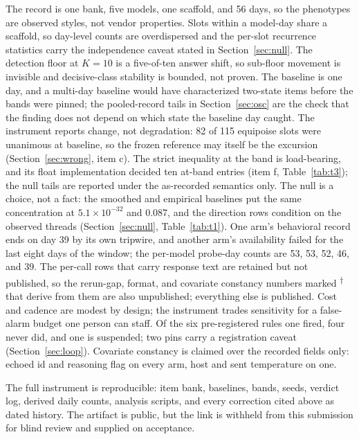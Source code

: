 \documentclass[conference]{IEEEtran}
\newcommand{\rows}{\textsuperscript{$\dagger$}}
\begin{document}
The record is one bank, five models, one scaffold, and 56 days, so the
phenotypes are observed styles, not vendor properties. Slots within a
model-day share a scaffold, so day-level counts are overdispersed and
the per-slot recurrence statistics carry the independence caveat
stated in Section~\ref{sec:null}. The detection floor at $K{=}10$ is a
five-of-ten answer shift, so sub-floor movement is invisible and
decisive-class stability is bounded, not proven. The baseline is one
day, and a multi-day baseline would have characterized two-state items
before the bands were pinned; the pooled-record tails in
Section~\ref{sec:osc} are the check that the finding does not depend
on which state the baseline day caught. The instrument reports change,
not degradation: 82 of 115 equipoise slots were unanimous at baseline,
so the frozen reference may itself be the excursion
(Section~\ref{sec:wrong}, item c). The strict inequality at the band
is load-bearing, and its float implementation decided ten at-band
entries (item f, Table~\ref{tab:t3}); the null tails are reported
under the as-recorded semantics only. The null is a choice, not a
fact: the smoothed and empirical baselines put the same concentration
at $5.1\times10^{-32}$ and 0.087, and the direction rows condition on
the observed threads (Section~\ref{sec:null}, Table~\ref{tab:t1}). One
arm's behavioral record ends on day 39 by its own tripwire, and
another arm's availability failed for the last eight days of the
window; the per-model probe-day counts are 53, 53, 52, 46, and 39. The
per-call rows that carry response text are retained but not published,
so the rerun-gap, format, and covariate constancy numbers marked \rows
that derive from them are also unpublished; everything else is
published. Cost and cadence are modest by design; the instrument
trades sensitivity for a false-alarm budget one person can staff. Of
the six pre-registered rules one fired, four never did, and one is
suspended; two pins carry a registration caveat
(Section~\ref{sec:loop}). Covariate constancy is claimed over the
recorded fields only: echoed id and reasoning flag on every arm, host
and sent temperature on one.

The full instrument is reproducible: item bank, baselines, bands,
seeds, verdict log, derived daily counts, analysis scripts, and every
correction cited above as dated history. The artifact is public, but
the link is withheld from this submission for blind review and
supplied on acceptance.



\end{document}
